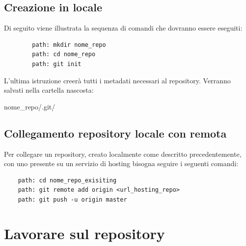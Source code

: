 	\subsection{Creazione in locale} %
	\label{sub:creazione_in_locale}
	Di seguito viene illustrata la sequenza di comandi che dovranno essere eseguiti:
		\begin{verbatim}
		path: mkdir nome_repo
		path: cd nome_repo
		path: git init
		\end{verbatim}
	\noindent
	L'ultima istruzione creerà tutti i metadati necessari al repository. Verranno salvati nella cartella nascosta:
		\begin{center}
			nome\_repo/.git/
		\end{center}


	\subsection{Collegamento repository locale con remota} %
	\label{sub:collegamento_repository_locale_con_remota}
	Per collegare un repository, creato localmente come descritto precedentemente, con uno presente su un servizio di hosting bisogna seguire i seguenti comandi:
	\begin{verbatim}
	path: cd nome_repo_exisiting
	path: git remote add origin <url_hosting_repo>
	path: git push -u origin master
	\end{verbatim}



\newpage \clearpage
\section{Lavorare sul repository} %
\label{sec:lavorare_sul_repository}

